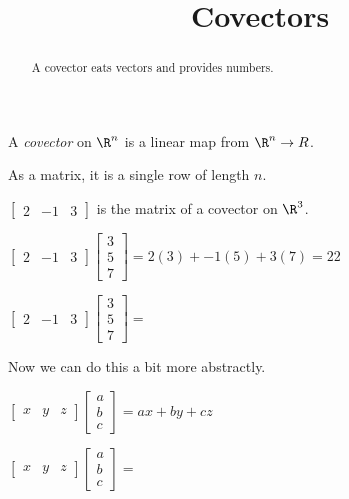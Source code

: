 \begin{ximera}

\title{Covectors}



\begin{abstract}
  A covector eats vectors and provides numbers.
\end{abstract}

\begin{definition}
  A \textit{covector} on $\R^n$ is a linear map from $\R^n \to R$.

  As a matrix, it is a single row of length $n$.
\end{definition}

\begin{example}
  $\begin{bmatrix} 2 & -1 & 3 \end{bmatrix}$ is the matrix of a
  covector on $\R^3$.
\end{example}

\begin{question}
  \begin{solution}
    \begin{hint}
      $\begin{bmatrix} 2 & -1 & 3 \end{bmatrix} \begin{bmatrix} 3\\5\\7 \end{bmatrix} = 2(3)+-1(5)+3(7) = 22$
    \end{hint}
    $\begin{bmatrix} 2 & -1 & 3 \end{bmatrix} \begin{bmatrix} 3\\5\\7 \end{bmatrix} = $
  \end{solution}

  Now we can do this a bit more abstractly.

  \begin{hint}
    $\begin{bmatrix} x & y & z \end{bmatrix} \begin{bmatrix} a \\b\\c\end{bmatrix} = ax+by+cz$ 
  \end{hint}
  $\begin{bmatrix} x & y & z \end{bmatrix} \begin{bmatrix} a \\b\\c\end{bmatrix} =$ 
\end{question}


\end{ximera}

